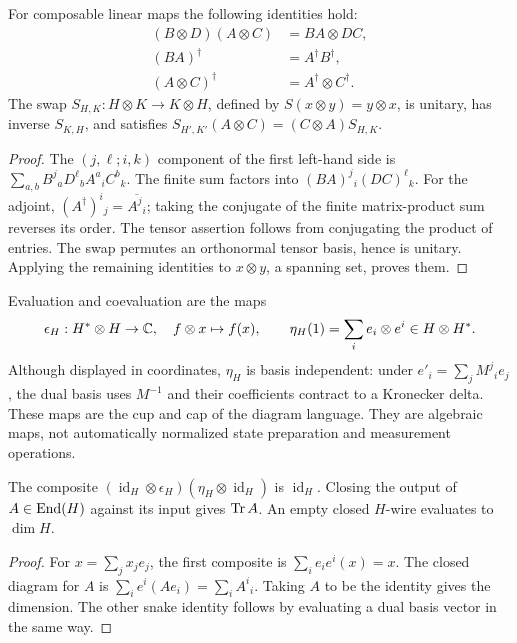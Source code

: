 \begin{proposition}
For composable linear maps the following identities hold:
\begin{align*}
 (B\otimes D)(A\otimes C)&=BA\otimes DC,\\
 (BA)^\dagger&=A^\dagger B^\dagger,\\
 (A\otimes C)^\dagger&=A^\dagger\otimes C^\dagger.
\end{align*}
The swap $S_{H,K}:H\otimes K\to K\otimes H$, defined by
$S(x\otimes y)=y\otimes x$, is unitary, has inverse $S_{K,H}$, and satisfies
$S_{H',K'}(A\otimes C)=(C\otimes A)S_{H,K}$.
\end{proposition}
\begin{proof}
The $(j,\ell;i,k)$ component of the first left-hand side is
$\sum_{a,b}B^j{}_aD^\ell{}_bA^a{}_iC^b{}_k$.
The finite sum factors into $(BA)^j{}_i(DC)^\ell{}_k$.
For the adjoint, $(A^\dagger)^i{}_j=\overline{A^j{}_i}$; taking the conjugate of the finite matrix-product sum reverses its order. The tensor assertion follows from conjugating the product of entries. The swap permutes an orthonormal tensor basis, hence is unitary. Applying the remaining identities to $x\otimes y$, a spanning set, proves them.
\end{proof}

Evaluation and coevaluation are the maps
\[
 \epsilon_H:H^*\otimes H\to\mathbb{C},\quad f\otimes x\mapsto f(x),
 \qquad
 \eta_H(1)=\sum_i e_i\otimes e^i\in H\otimes H^*.
\]
Although displayed in coordinates, $\eta_H$ is basis independent: under $e'_i=\sum_jM^j{}_ie_j$, the dual basis uses $M^{-1}$ and their coefficients contract to a Kronecker delta. These maps are the cup and cap of the diagram language. They are algebraic maps, not automatically normalized state preparation and measurement operations.

\begin{proposition}
The composite
$(\operatorname{id}_H\otimes\epsilon_H)(\eta_H\otimes\operatorname{id}_H)$
is $\operatorname{id}_H$. Closing the output of $A\in\operatorname{End}(H)$ against its input gives $\operatorname{Tr} A$. An empty closed $H$-wire evaluates to $\dim H$.
\end{proposition}
\begin{proof}
For $x=\sum_jx_je_j$, the first composite is
$\sum_i e_i e^i(x)=x$. The closed diagram for $A$ is
$\sum_i e^i(Ae_i)=\sum_iA^i{}_i$. Taking $A$ to be the identity gives the dimension. The other snake identity follows by evaluating a dual basis vector in the same way.
\end{proof}

